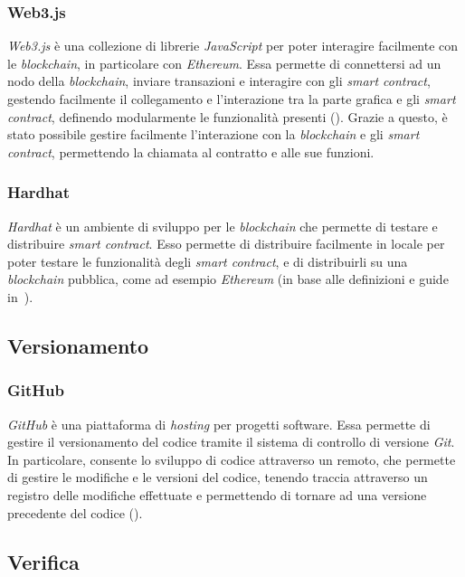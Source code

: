 \subsubsection{Web3.js}\label{subsubsec:web3js}
\textit{Web3.js} è una collezione di librerie \textit{JavaScript} per poter interagire facilmente con le \textit{blockchain}, in particolare con \textit{Ethereum}.
Essa permette di connettersi ad un nodo della \textit{blockchain}, inviare transazioni e interagire con gli \textit{smart contract}, gestendo facilmente il collegamento
e l'interazione tra la parte grafica e gli \textit{smart contract}, definendo modularmente le funzionalità presenti (\cite{site:web3}).
Grazie a questo, è stato possibile gestire facilmente l'interazione con la \textit{blockchain} e gli \textit{smart contract}, permettendo la chiamata al contratto
e alle sue funzioni.

\subsubsection{Hardhat}\label{subsubsec:hardhat}
\textit{Hardhat} è un ambiente di sviluppo per le \textit{blockchain} che permette di testare e distribuire \textit{smart contract}. Esso permette di distribuire facilmente
in locale per poter testare le funzionalità degli \textit{smart contract}, e di distribuirli su una \textit{blockchain} pubblica, come ad esempio
\textit{Ethereum} (in base alle definizioni e guide in~\cite{site:hardhat}).

\subsection{Versionamento}\label{subsec:versionamento}

\subsubsection{GitHub}\label{subsubsec:github}
\textit{GitHub} è una piattaforma di \textit{hosting} per progetti software. Essa permette di gestire il versionamento del codice tramite il sistema di controllo di versione \textit{Git}.
In particolare, consente lo sviluppo di codice attraverso un  remoto, che permette di gestire le modifiche e le versioni del codice, tenendo traccia attraverso un registro
delle modifiche effettuate e permettendo di tornare ad una versione precedente del codice (\cite{site:github}). 

\subsection{Verifica}\label{subsec:verifica}

